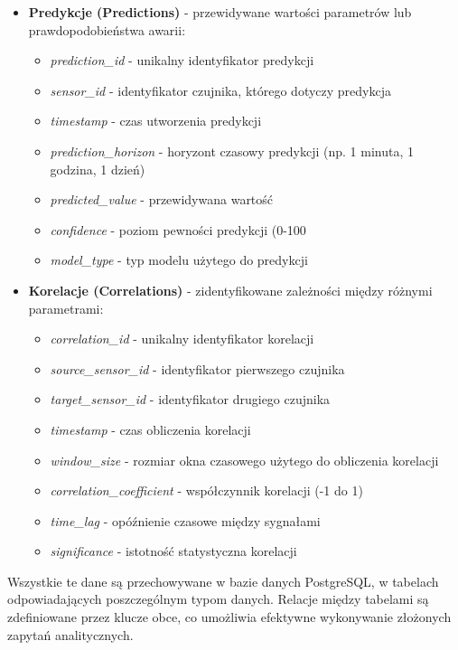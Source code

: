 \begin{itemize}
    \item \textbf{Predykcje (Predictions)} - przewidywane wartości parametrów lub prawdopodobieństwa awarii:
    \begin{itemize}
        \item \textit{prediction\_id} - unikalny identyfikator predykcji
        \item \textit{sensor\_id} - identyfikator czujnika, którego dotyczy predykcja
        \item \textit{timestamp} - czas utworzenia predykcji
        \item \textit{prediction\_horizon} - horyzont czasowy predykcji (np. 1 minuta, 1 godzina, 1 dzień)
        \item \textit{predicted\_value} - przewidywana wartość
        \item \textit{confidence} - poziom pewności predykcji (0-100%
        \item \textit{model\_type} - typ modelu użytego do predykcji
    \end{itemize}
    
    \item \textbf{Korelacje (Correlations)} - zidentyfikowane zależności między różnymi parametrami:
    \begin{itemize}
        \item \textit{correlation\_id} - unikalny identyfikator korelacji
        \item \textit{source\_sensor\_id} - identyfikator pierwszego czujnika
        \item \textit{target\_sensor\_id} - identyfikator drugiego czujnika
        \item \textit{timestamp} - czas obliczenia korelacji
        \item \textit{window\_size} - rozmiar okna czasowego użytego do obliczenia korelacji
        \item \textit{correlation\_coefficient} - współczynnik korelacji (-1 do 1)
        \item \textit{time\_lag} - opóźnienie czasowe między sygnałami
        \item \textit{significance} - istotność statystyczna korelacji
    \end{itemize}
\end{itemize}

Wszystkie te dane są przechowywane w bazie danych PostgreSQL, w tabelach odpowiadających poszczególnym typom danych. Relacje między tabelami są zdefiniowane przez klucze obce, co umożliwia efektywne wykonywanie złożonych zapytań analitycznych.

